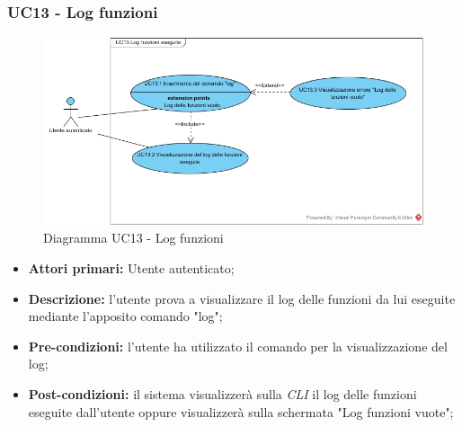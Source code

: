 \subsubsection{UC13 - Log funzioni}
\begin{figure}[h]
	\centering
	\includegraphics[width=\linewidth]{res/img/UC13.jpg}
	\caption{Diagramma UC13 - Log funzioni}
\end{figure}
\begin{itemize}
	\item \textbf{Attori primari:} Utente autenticato;
	\item \textbf{Descrizione:} l'utente prova a visualizzare il log delle funzioni da lui eseguite mediante l'apposito comando "log"; 
	\item \textbf{Pre-condizioni:} l'utente ha utilizzato il comando per la visualizzazione del log;
	\item \textbf{Post-condizioni:} il sistema visualizzerà sulla \textit{CLI\glo} il log delle funzioni eseguite dall'utente oppure visualizzerà sulla schermata "Log funzioni vuote";
\end{itemize}